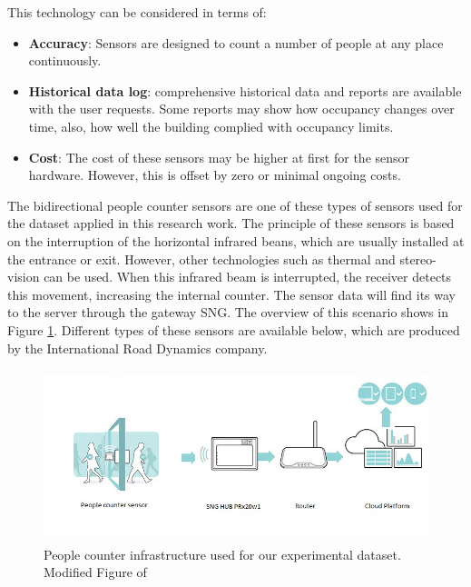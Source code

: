 \documentclass[../UNBThesis2.tex]{subfiles}
\begin{document}
This technology can be considered in terms of:
\begin{itemize}
    \item\textbf{Accuracy}: Sensors are designed to count a number of people at any place continuously.
    \item\textbf{Historical data log}: comprehensive historical data and reports are available with the user requests. Some reports may show how occupancy changes over time, also, how well the building complied with occupancy limits.
    \item\textbf{Cost}: The cost of these sensors may be higher at first for the sensor hardware. However, this is offset by zero or minimal ongoing costs.
\end{itemize}

The bidirectional people counter sensors are one of these types of sensors used for the dataset applied in this research work. The principle of these sensors is based on the interruption of the horizontal infrared beans, which are usually installed at the entrance or exit. However, other technologies such as thermal and stereo-vision can be used. When this infrared beam is interrupted, the receiver detects this movement, increasing the internal counter. The sensor data will find its way to the server through the gateway SNG. The overview of this scenario shows in Figure \ref{people}. Different types of these sensors are available below, which are produced by the International Road Dynamics company.

\begin{figure}
\centering
\includegraphics[width = 12cm,height = 5cm]{image/pc.jpg}
\caption{People counter infrastructure used for our experimental dataset. Modified Figure of \protect\cite{SensM}}
\label{people}
\end{figure}
\end{document}
